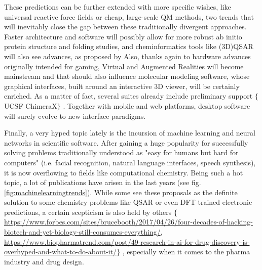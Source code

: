 These predictions can be further extended with more specific wishes, like universal reactive force fields or cheap, large-scale QM methods, two trends that will inevitably close the gap between these traditionally divergent approaches. Faster architecture and software will possibly allow for more robust ab initio protein structure and folding studies,\cite{Lee2017} and cheminformatics tools like (3D)QSAR will also see advances, as proposed by \citet{Cherkasov2013} Also, thanks again to hardware advances originally intended for gaming, Virtual and Augmented Realities will become mainstream and that should also influence molecular modeling software, whose graphical interfaces, built around an interactive 3D viewer, will be certainly enriched. As a matter of fact, several suites already include preliminary support $ \{ $ UCSF ChimeraX$ \} $ . Together with mobile and web platforms, desktop software will surely evolve to new interface paradigms.

Finally, a very hyped topic lately is the incursion of machine learning and neural networks in scientific software. After gaining a huge popularity for successfully solving problems traditionally understood as "easy for humans but hard for computers"  (i.e. facial recognition, natural language interfaces, speech synthesis), it is now overflowing to fields like computational chemistry. Being such a hot topic, a lot of publications have arisen in the last years (see fig. \ref{fig:machinelearningtrends}). While some see these proposals as the definite solution to some chemistry problems like QSAR\cite{paliwal2015,Ma2015,schutt2016,goh2017,goh2017b,koutsoukas2017,mayr2016} or even DFT-trained electronic predictions,\cite{faber2017} a certain scepticism is also held by others $ \{ $ \href{https://www.forbes.com/sites/brucebooth/2017/04/26/four-decades-of-hacking-biotech-and-yet-biology-still-consumes-everything/}{https://www.forbes.com/sites/brucebooth/2017/04/26/four-decades-of-hacking-biotech-and-yet-biology-still-consumes-everything/}, \href{https://www.biopharmatrend.com/post/49-research-in-ai-for-drug-discovery-is-overhyped-and-what-to-do-about-it/}{https://www.biopharmatrend.com/post/49-research-in-ai-for-drug-discovery-is-overhyped-and-what-to-do-about-it/}$ \} $ , especially when it comes to the pharma industry and drug design.


